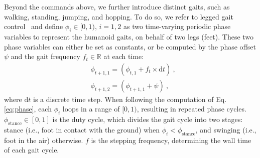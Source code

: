 Beyond the commands above, we further introduce distinct gaits, such as walking, standing, jumping, and hopping. To do so, we refer to legged gait control~\cite{2021BipedalPeriodicReward, margolis2022walktheseways} and define $\phi_i \in [0, 1)$, $i = 1, 2$ as two 
time-varying periodic phase variables to represent the humanoid gaits, on behalf of two legs (feet).
These two phase variables can either be set as constants, or be computed by the phase offset $\psi$ and the gait frequency $f_t \in \mathbb{R}$ at each time: 
\begin{equation}\label{eq:phase}
\begin{aligned}
& \phi_{t+1, 1} = \left ( \phi_{t,1} + f_t \times \text{d}t \right)~, \\
& \phi_{t+1, 2} = \left ( \phi_{t+1, 1} + \psi \right)~,
\end{aligned}
\end{equation}
where $\text{d}t$ is a discrete time step. When following the computation of Eq. \ref{eq:phase}, each $\phi_i$ loops in a range of $[0,1)$, resulting in repeated phase cycles. 
$\phi_{\text{stance}} \in [0, 1]$ is the duty cycle, which divides the gait cycle into two stages: stance (i.e., foot in contact with the ground) when $\phi_i < \phi_{\text{stance}}$, and swinging (i.e., foot in the air) otherwise. $f$ is the stepping frequency, determining the wall time of each gait cycle.


